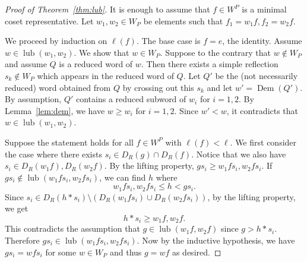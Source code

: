 \documentclass[10pt,a4paper]{amsart}
\newcommand{\dem}{\operatorname{Dem}}
\newcommand{\lub}{\operatorname{lub}}
\begin{document}
\begin{proof}[Proof of Theorem~\ref{thm:lub}]
    It is enough to assume that $f\in W^P$ is a minimal coset representative. Let $w_1,w_2\in W_P$ be elements such that $f_1 = w_1f, f_2 = w_2f$. 
    
    We proceed by induction on $\ell(f)$. The base case is $f=e$, the identity. Assume $w\in \lub(w_1,w_2)$. We show that $w\in W_P$. Suppose to the contrary that $w\not\in W_P$ and assume $Q$ is a reduced word of $w$. Then there exists a simple reflection $s_k\not \in W_P$ which appears in the reduced word of $Q$. Let $Q'$ be the (not necessarily reduced) word obtained from $Q$ by crossing out this $s_k$ and let $w'=\dem(Q')$. By assumption, $Q'$ contains a reduced subword of $w_i$ for $i=1,2$. By Lemma~\ref{lem:dem}, we have $w\ge w_i$ for $i=1,2$. Since $w'<w$, it contradicts that $w\in \lub(w_1, w_2)$.

    Suppose the statement holds for all $f\in W^P$ with $\ell(f)< \ell$. We first consider the case where there exists $s_i \in D_{R}(g)\cap D_{R}(f)$. Notice that we also have $s_i \in D_{R}(w_1f),D_{R}(w_2f)$. By the lifting property, $gs_i\geq w_1fs_i,w_2fs_i$. If $gs_i\notin \lub(w_1fs_i,w_2fs_i)$, we can find $h$ where 
    \[w_1fs_i,w_2fs_i \leq h<gs_i.\]
    Since $s_i\in D_{R}(h\ast s_i)\setminus (D_{R}(w_1fs_i)\cup D_{R}(w_2fs_i))$, by the lifting property, we get 
    \[h\ast s_i \geq w_1f,w_2f.\]
    This contradicts the assumption that $g\in \lub(w_1f,w_2f)$ since $g>h\ast s_i$. Therefore $gs_i\in \lub(w_1fs_i,w_2fs_i)$.  Now by the inductive hypothesis, we have $gs_i = wfs_i$ for some $w\in W_P$ and thus $g = wf$ as desired.


\end{proof}
\end{document}
